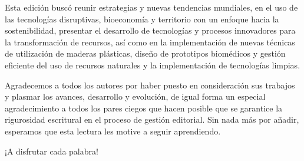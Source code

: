 \documentclass{article}
\begin{document}
Esta edición buscó reunir estrategias y nuevas tendencias mundiales, en el uso de las tecnologías disruptivas, bioeconomía y territorio con un enfoque hacia la sostenibilidad, presentar el desarrollo de tecnologías y procesos innovadores para la transformación de recursos, así como en la implementación de nuevas técnicas de utilización de maderas plásticas, diseño de prototipos biomédicos y gestión eficiente del uso de recursos naturales y la implementación de tecnologías limpias.

Agradecemos a todos los autores por haber puesto en consideración sus trabajos y plasmar los avances, desarrollo y evolución, de igual forma un especial agradecimiento a todos los pares ciegos que hacen posible que se garantice la rigurosidad escritural en el proceso de gestión editorial. Sin nada más por añadir, esperamos que esta lectura les motive a seguir aprendiendo.

¡A disfrutar cada palabra!
\end{document}
